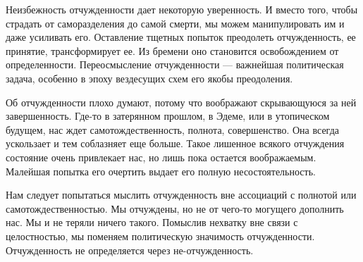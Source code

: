 \documentclass[11pt]{book}
\begin{document}
Неизбежность отчужденности дает некоторую уверенность. И вместо того, чтобы страдать от саморазделения до самой смерти, мы можем манипулировать им и даже усиливать его. Оставление тщетных попыток преодолеть отчужденность, ее принятие, трансформирует ее. Из бремени оно становится освобождением от определенности. Переосмысление отчужденности --- важнейшая политическая задача, особенно в эпоху вездесущих схем его якобы преодоления.

Об отчужденности плохо думают, потому что воображают скрывающуюся за ней завершенность. Где-то в затерянном прошлом, в Эдеме, или в утопическом будущем, нас ждет самотождественность, полнота, совершенство. Она всегда ускользает и тем соблазняет еще больше. Такое лишенное всякого отчуждения состояние очень привлекает нас, но лишь пока остается воображаемым. Малейшая попытка его очертить выдает его полную несостоятельность.

Нам следует попытаться мыслить отчужденность вне ассоциаций с полнотой или самотождественностью. Мы отчуждены, но не от чего-то могущего дополнить нас. Мы и не теряли ничего такого. Помыслив нехватку вне связи с целостностью, мы поменяем политическую значимость отчужденности. Отчужденность не определяется через не-отчужденность.
\end{document}
